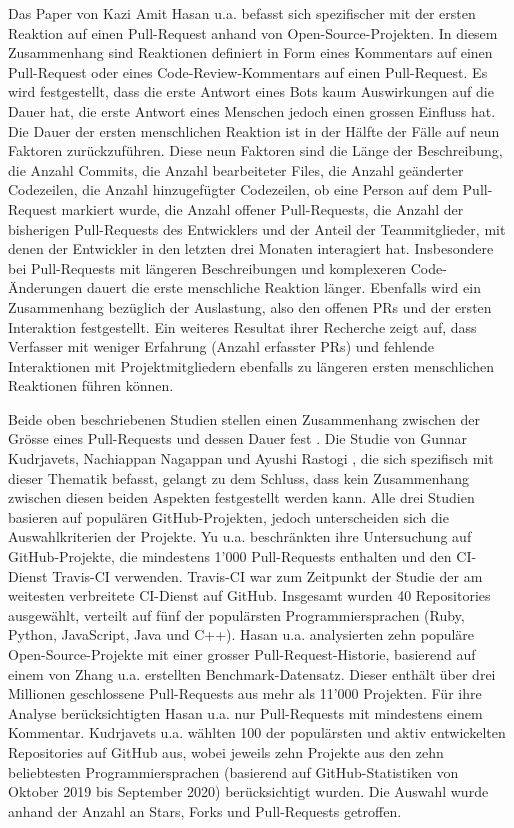Das Paper von Kazi Amit Hasan u.a.\parencite{hasan_understanding_2023} befasst sich spezifischer mit der ersten Reaktion auf einen Pull-Request anhand von Open-Source-Projekten. In diesem Zusammenhang sind Reaktionen definiert in Form eines Kommentars auf einen Pull-Request oder eines Code-Review-Kommentars auf einen Pull-Request. Es wird festgestellt, dass die erste Antwort eines Bots kaum Auswirkungen auf die Dauer hat, die erste Antwort eines Menschen jedoch einen grossen Einfluss hat. Die Dauer der ersten menschlichen Reaktion ist in der Hälfte der Fälle auf neun Faktoren zurückzuführen. Diese neun Faktoren sind die Länge der Beschreibung, die Anzahl Commits, die Anzahl bearbeiteter Files, die Anzahl geänderter Codezeilen, die Anzahl hinzugefügter Codezeilen,  ob eine Person auf dem Pull-Request markiert wurde, die Anzahl offener Pull-Requests, die Anzahl der bisherigen Pull-Requests des Entwicklers und der Anteil der Teammitglieder, mit denen der Entwickler in den letzten drei Monaten interagiert hat. Insbesondere bei Pull-Requests mit längeren Beschreibungen und komplexeren Code-Änderungen dauert die erste menschliche Reaktion länger. Ebenfalls wird ein Zusammenhang bezüglich der Auslastung, also den offenen PRs und der ersten Interaktion festgestellt. Ein weiteres Resultat ihrer Recherche zeigt auf, dass Verfasser mit weniger Erfahrung (Anzahl erfasster PRs) und fehlende Interaktionen mit Projektmitgliedern ebenfalls zu längeren ersten menschlichen Reaktionen führen können.\parencite{hasan_understanding_2023} 

Beide oben beschriebenen Studien stellen einen Zusammenhang zwischen der Grösse eines Pull-Requests und dessen Dauer fest \parencite{yu_wait_2015}\parencite{hasan_understanding_2023}. Die Studie von Gunnar Kudrjavets, Nachiappan Nagappan und Ayushi Rastogi  \parencite{hasan_understanding_2023}, die sich spezifisch mit dieser Thematik befasst, gelangt zu dem Schluss, dass kein Zusammenhang zwischen diesen beiden Aspekten festgestellt werden kann. Alle drei Studien basieren auf populären GitHub-Projekten, jedoch unterscheiden sich die Auswahlkriterien der Projekte. Yu u.a.\parencite{yu_wait_2015} beschränkten ihre Untersuchung auf GitHub-Projekte, die mindestens 1'000 Pull-Requests enthalten und den CI-Dienst Travis-CI verwenden. Travis-CI war zum Zeitpunkt der Studie der am weitesten verbreitete CI-Dienst auf GitHub. Insgesamt wurden 40 Repositories ausgewählt, verteilt auf fünf der populärsten Programmiersprachen (Ruby, Python, JavaScript, Java und C++). Hasan u.a.\parencite{hasan_understanding_2023} analysierten zehn populäre Open-Source-Projekte mit einer grosser Pull-Request-Historie, basierend auf einem von Zhang u.a.\parencite{zhang_pull_2022} erstellten Benchmark-Datensatz. Dieser enthält über drei Millionen geschlossene Pull-Requests aus mehr als 11'000 Projekten. Für ihre Analyse berücksichtigten Hasan u.a. nur Pull-Requests mit mindestens einem Kommentar. Kudrjavets u.a.\parencite{kudrjavets_small_2022} wählten 100 der populärsten und aktiv entwickelten Repositories auf GitHub aus, wobei jeweils zehn Projekte aus den zehn beliebtesten Programmiersprachen (basierend auf GitHub-Statistiken von Oktober 2019 bis September 2020) berücksichtigt wurden. Die Auswahl wurde anhand der Anzahl an Stars, Forks und Pull-Requests getroffen.

